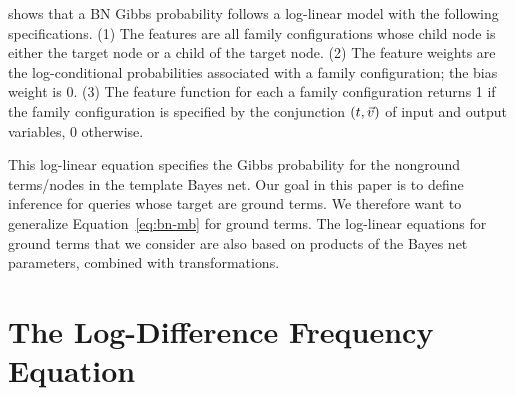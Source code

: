 \documentclass[twoside,11pt]{article}
\begin{document}
\noindent shows that a BN Gibbs probability follows a log-linear model with the following specifications. (1) The features are all family configurations whose child node is either the target node or a child of the target node. (2) The feature weights are the log-conditional probabilities associated with a family configuration; the bias weight is 0. (3) The feature function for each a family configuration returns 1 if the family configuration is specified by the conjunction $(t,\vec{v})$ of input and output variables, 0 otherwise. 

This log-linear equation specifies the Gibbs probability for the nonground terms/nodes in the template Bayes net. Our goal in this paper is to define inference for queries whose target are ground terms. We therefore want to generalize Equation~\eqref{eq:bn-mb} for ground terms. The log-linear equations for ground terms that we consider are also based on products of the Bayes net parameters, combined with transformations. 



\section{The Log-Difference Frequency Equation} 
\label{sec:theequation}
\end{document}
